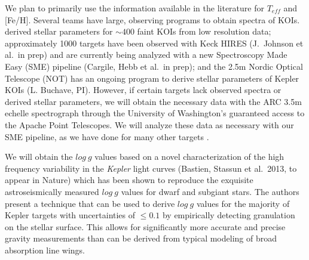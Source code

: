 
We plan to primarily use the information available in the literature
for $T_{eff}$ and [Fe/H].  Several teams have large, observing programs
to obtain spectra of KOIs.  \citet{Everett2013} derived stellar
parameters for $\sim 400$ faint KOIs from low resolution data;
approximately 1000 targets have been observed with Keck HIRES
(J.~Johnson et al.\ in prep) and are currently being analyzed with a
new Spectroscopy Made Easy (SME) pipeline (Cargile, Hebb et al.\ in
prep); and the 2.5m Nordic Optical Telescope (NOT) has an ongoing
program to derive stellar parameters of Kepler KOIs (L. Buchave, PI).
However, if certain targets lack observed spectra or derived stellar
parameters, we will obtain the necessary data with the ARC 3.5m
echelle spectrograph through the University of Washington's guaranteed
access to the Apache Point Telescopes.  We will analyze these data as
necessary with our SME pipeline, as we have done for many other
targets \citep[e.g.][]{Wisniewski2012}.

We will obtain the $log~g$ values based on a novel characterization of
the high frequency variability in the {\it Kepler} light curves
(Bastien, Stassun et al.\ 2013, to appear in Nature) which has been
shown to reproduce the exquisite astroseismically measured $log~g$
values \citep{Huber2013} for dwarf and subgiant stars.  The authors
present a technique that can be used to derive $log~g$ values for the
majority of Kepler targets with uncertainties of $\le 0.1$ by
empirically detecting granulation on the stellar surface.  This allows
for significantly more accurate and precise gravity measurements than
can be derived from typical modeling of broad absorption line wings.

